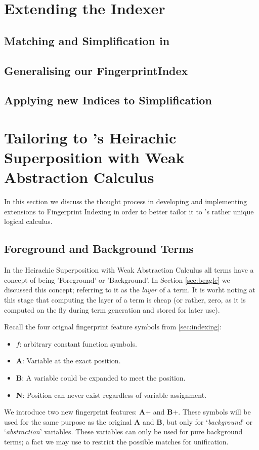 \section{Extending the Indexer}

\subsection{Matching and Simplification in \Beagle}

\subsection{Generalising our FingerprintIndex}

\subsection{Applying new Indices to Simplification}

\section{Tailoring to \Beagle's Heirachic Superposition with Weak Abstraction Calculus}
\label{sec:tailored}

In this section we discuss the thought process in developing and implementing
extensions to Fingerprint Indexing in order to better tailor it to \beagle's
rather unique logical calculus.

\subsection{Foreground and Background Terms}

In the Heirachic Superposition with Weak Abstraction Calculus all terms have 
a concept of being 'Foreground' or 'Background'. In Section \ref{sec:beagle} we
discussed this concept; referring to it as the \emph{layer} of a term. It is
worht noting at this stage that computing the layer of a term is cheap (or rather,
zero, as it is computed on the fly during term generation and stored for later use).

Recall the four orignal fingerprint feature symbols from \ref{sec:indexing}:
\begin{itemize}
\item $f$: arbitrary constant function symbols.
\item \textbf{A}: Variable at the exact position.
\item \textbf{B}: A variable could be expanded to meet the position.
\item \textbf{N}: Position can never exist regardless of variable assignment.
\end{itemize}
We introduce two new fingerprint features: \textbf{A}+ and \textbf{B}+.
These symbols will be used for the same purpose as the original \textbf{A} and \textbf{B}, but
only for `\emph{background}' or `\emph{abstraction}' variables. These variables
can only be used for pure background terms; a fact we may use to restrict the possible
matches for unification.

